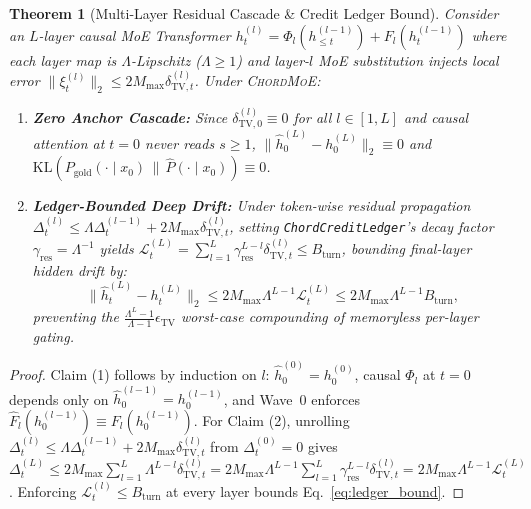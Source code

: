 \documentclass[10pt,twocolumn]{article}
\newtheorem{theorem}{Theorem}
\theoremstyle{definition}
\begin{document}
\begin{theorem}[Multi-Layer Residual Cascade \& Credit Ledger Bound]
\label{thm:ledger}
Consider an $L$-layer causal MoE Transformer $h_t^{(l)} = \Phi_l(h_{\le t}^{(l-1)}) + F_l(h_t^{(l-1)})$ where each layer map is $\Lambda$-Lipschitz ($\Lambda \ge 1$) and layer-$l$ MoE substitution injects local error $\|\xi_t^{(l)}\|_2 \le 2 M_{\max} \delta_{\mathrm{TV},t}^{(l)}$. Under \textsc{ChordMoE}:
\begin{enumerate}
  \item \textbf{Zero Anchor Cascade:} Since $\delta_{\mathrm{TV},0}^{(l)} \equiv 0$ for all $l \in [1, L]$ and causal attention at $t=0$ never reads $s \ge 1$, $\|\hat{h}_0^{(L)} - h_0^{(L)}\|_2 \equiv 0$ and $\mathrm{KL}(P_{\mathrm{gold}}(\cdot \mid x_0) \,\|\, \hat{P}(\cdot \mid x_0)) \equiv 0$.
  \item \textbf{Ledger-Bounded Deep Drift:} Under token-wise residual propagation $\Delta_t^{(l)} \le \Lambda \Delta_t^{(l-1)} + 2 M_{\max} \delta_{\mathrm{TV},t}^{(l)}$, setting \texttt{ChordCreditLedger}'s decay factor $\gamma_{\mathrm{res}} = \Lambda^{-1}$ yields $\mathcal{L}_t^{(L)} = \sum_{l=1}^{L} \gamma_{\mathrm{res}}^{L-l} \delta_{\mathrm{TV},t}^{(l)} \le B_{\mathrm{turn}}$, bounding final-layer hidden drift by:
  \begin{equation}
    \|\hat{h}_t^{(L)} - h_t^{(L)}\|_2 \le 2 M_{\max} \Lambda^{L-1} \mathcal{L}_t^{(L)} \le 2 M_{\max} \Lambda^{L-1} B_{\mathrm{turn}},
    \label{eq:ledger_bound}
  \end{equation}
  preventing the $\frac{\Lambda^L - 1}{\Lambda - 1}\epsilon_{\mathrm{TV}}$ worst-case compounding of memoryless per-layer gating.
\end{enumerate}
\end{theorem}

\begin{proof}
Claim (1) follows by induction on $l$: $\hat{h}_0^{(0)} = h_0^{(0)}$, causal $\Phi_l$ at $t=0$ depends only on $\hat{h}_0^{(l-1)} = h_0^{(l-1)}$, and Wave~0 enforces $\hat{F}_l(h_0^{(l-1)}) \equiv F_l(h_0^{(l-1)})$. For Claim (2), unrolling $\Delta_t^{(l)} \le \Lambda \Delta_t^{(l-1)} + 2 M_{\max} \delta_{\mathrm{TV},t}^{(l)}$ from $\Delta_t^{(0)} = 0$ gives $\Delta_t^{(L)} \le 2 M_{\max} \sum_{l=1}^{L} \Lambda^{L-l} \delta_{\mathrm{TV},t}^{(l)} = 2 M_{\max} \Lambda^{L-1} \sum_{l=1}^{L} \gamma_{\mathrm{res}}^{L-l} \delta_{\mathrm{TV},t}^{(l)} = 2 M_{\max} \Lambda^{L-1} \mathcal{L}_t^{(L)}$. Enforcing $\mathcal{L}_t^{(l)} \le B_{\mathrm{turn}}$ at every layer bounds Eq.~\eqref{eq:ledger_bound}.
\end{proof}
\end{document}
